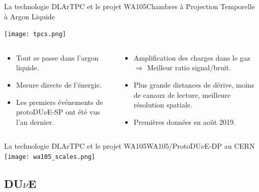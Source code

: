     \begin{frame}{La technologie DLArTPC et le projet WA105}{Chambres à Projection Temporelle à Argon Liquide}
       	\begin{scriptsize}
       			\texttt{[image: tpcs.png]}\\\vfill
       			\begin{columns}
       				\begin{column}{0.5\textwidth}
       					\begin{itemize}
       						\item Tout se passe dans l'argon liquide.
       						\item Mesure directe de l'énergie.
       						\item Les premiers événements de protoDU$\nu$E-SP ont été vus l'an dernier.
       					\end{itemize}
       				\end{column}\hfill
       				\begin{column}{0.5\textwidth}
       					\begin{itemize}
       						\item Amplification des charges dans le gaz\\$\Rightarrow$ Meilleur ratio signal/bruit.
       						\item Plus grande distances de dérive, moins de canaux de lecture, meilleure résolution spatiale.
       						\item Premières données en août 2019.
       					\end{itemize}
       				\end{column}
       			\end{columns}
       	\end{scriptsize}
    \end{frame}

    \begin{frame}{La technologie DLArTPC et le projet WA105}{WA105/\texorpdfstring{ProtoDU$\nu$E}{ProtoDUNE}-DP au CERN}
        \centering
       	\vspace{-0.5cm}\hspace{-0.4cm}\texttt{[image: wa105\_scales.png]}
    \end{frame}
    
    \subsection{DU$\nu$E}

